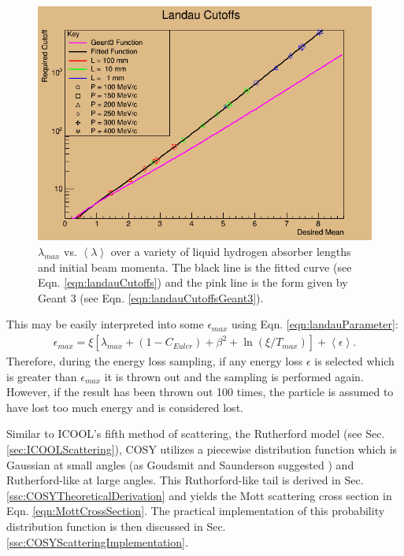 \begin{figure}
  \centering
    \includegraphics[width=\textwidth]{Figures/landau_cutoffs} 
  \caption{$\lambda_{max}$ vs. $\left<\lambda\right>$ over a variety of liquid hydrogen absorber lengths and initial beam momenta. The black line is the fitted curve (see Eqn. \ref{eqn:landauCutoffs}) and the pink line is the form given by Geant 3 (see Eqn. \ref{eqn:landauCutoffsGeant3}). }
  \label{fig:landau_cutoffs}
\end{figure}

This may be easily interpreted into some $\epsilon_{max}$ using Eqn. \ref{eqn:landauParameter}:
\begin{align*}
\epsilon_{max}=\xi[\lambda_{max}+(1-C_{Euler})+\beta^2+\ln(\xi/T_{max})]+\left<\epsilon\right>.
\end{align*}
Therefore, during the energy loss sampling, if any energy loss $\epsilon$ is selected which is greater than $\epsilon_{max}$ it is thrown out and the sampling is performed again. However, if the result has been thrown out 100 times, the particle is assumed to have lost too much energy and is considered lost.

%
%
 \label{sec:COSYScattering}\par
Similar to ICOOL's fifth method of scattering, the Rutherford model (see Sec. \ref{sec:ICOOLScattering}), COSY utilizes a piecewise distribution function which is Gaussian  at small angles (as Goudsmit and Saunderson suggested \cite{gs}) and Rutherford-like at large angles. This Ruthorford-like tail is derived in Sec. \ref{ssc:COSYTheoreticalDerivation} and yields the Mott scattering cross section in Eqn. \ref{eqn:MottCrossSection}. The practical implementation of this probability distribution function is then discussed in Sec. \ref{ssc:COSYScatteringImplementation}.

